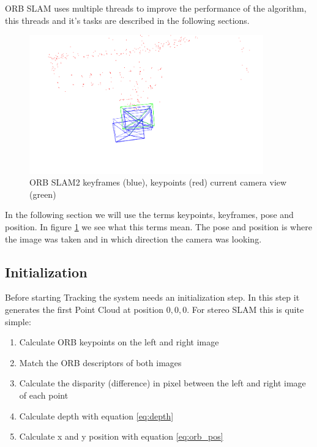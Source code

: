 \documentclass[11pt,a4paper,titlepage,oneside]{report}
\begin{document}
ORB SLAM uses multiple threads to improve the performance of the algorithm, this threads and it's tasks are described in the following sections.

\begin{figure}[H]
  \begin{center}
		\includegraphics[width=0.9\textwidth]{img/pose_map.png}
  \end{center}
	\caption{ORB SLAM2 keyframes (blue), keypoints (red) current camera view (green)}\label{fig:pose_map}
\end{figure}

In the following section we will use the terms keypoints, keyframes, pose and position. In figure \ref{fig:pose_map} we see what this terms mean. The pose and position is where the image was taken and in which direction the camera was looking.

\subsection{Initialization}

Before starting Tracking the system needs an initialization step. In this step it generates the first Point Cloud at position $0,0,0$. For stereo SLAM this is quite simple:
\begin{enumerate}
	\item Calculate ORB keypoints on the left and right image
	\item Match the ORB descriptors of both images
	\item Calculate the disparity (difference) in pixel between the left and right image of each point
	\item Calculate depth with equation \ref{eq:depth}
	\item Calculate x and y position with equation \ref{eq:orb_pos}
\end{enumerate}	
\end{document}
